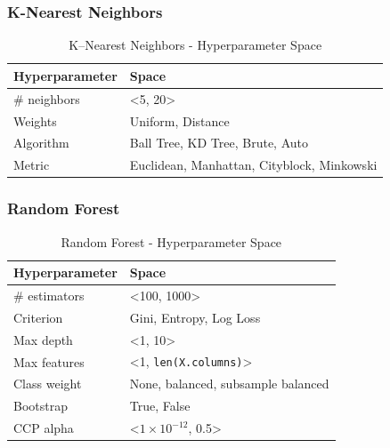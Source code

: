 \subsubsection{K-Nearest Neighbors}

\begin{table}[H]
    \small
    \setlength{\tabcolsep}{8pt}
    \renewcommand{\arraystretch}{1.3}
    \centering
        \caption[K--Nearest Neighbors - Hyperparameter Space]{K--Nearest Neighbors - Hyperparameter Space}\label{tab:knnspace}
        \begin{tabular}{ll}
    \toprule
    \textbf{Hyperparameter} & \textbf{Space}\\
    \midrule
    \hline
    \# neighbors & <5, 20> \\
    Weights & Uniform, Distance \\
    Algorithm & Ball Tree, KD Tree, Brute, Auto \\
    Metric & Euclidean, Manhattan, Cityblock, Minkowski \\
    \hline
    \bottomrule
    \end{tabular}
    \vspace{0.7em}

    \vspace{-1em}
\end{table}

\subsubsection{Random Forest}

\begin{table}[H]
    \small
    \setlength{\tabcolsep}{8pt}
    \renewcommand{\arraystretch}{1.3}
    \centering
        \caption[Random Forest - Hyperparameter Space]{Random Forest - Hyperparameter Space}\label{tab:rfspace}
        \begin{tabular}{ll}
    \toprule
    \textbf{Hyperparameter} & \textbf{Space}\\
    \midrule
    \hline
    \# estimators & <100, 1000> \\
    Criterion & Gini, Entropy, Log Loss \\
    Max depth & <1, 10> \\
    Max features & <1, \verb|len(X.columns)|>  \\
    Class weight & None, balanced, subsample balanced \\
    Bootstrap & True, False \\
    CCP alpha & <$1 \times 10^{-12}$, 0.5> \\
    \hline
    \bottomrule
    \end{tabular}
    \vspace{0.7em}

    \vspace{-1em}
\end{table}

